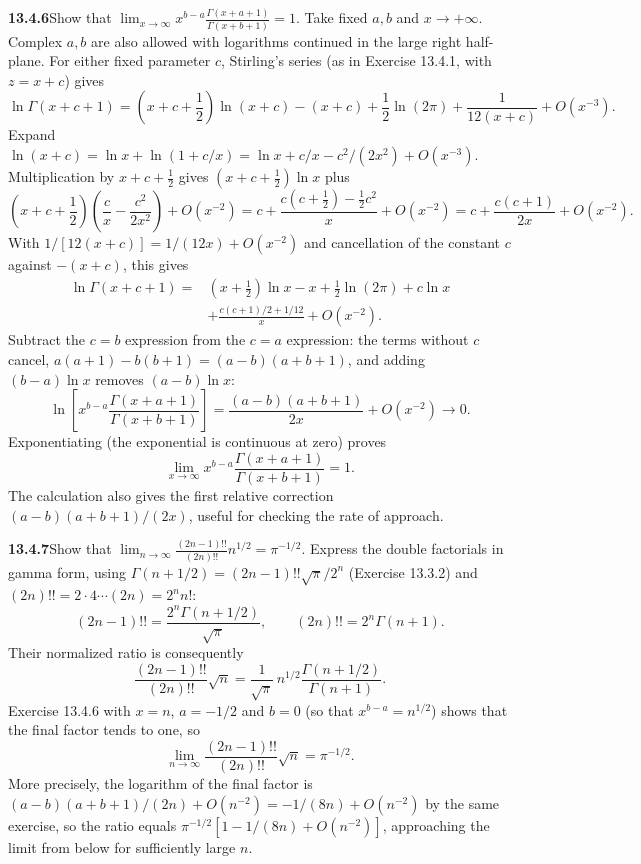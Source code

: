\par\bigskip
\noindent\textbf{13.4.6}\quad Show that
$\displaystyle\lim_{x\to\infty}x^{b-a}\frac{\Gamma(x+a+1)}{\Gamma(x+b+1)}=1$.
\solution
Take fixed $a,b$ and $x\to+\infty$.  Complex $a,b$ are also
allowed with logarithms continued in the large right half-plane.
For either fixed parameter $c$, Stirling's series (as in
Exercise 13.4.1, with $z=x+c$) gives
\[
\ln\Gamma(x+c+1)
=\left(x+c+\frac12\right)\ln(x+c)-(x+c)
+\frac12\ln(2\pi)+\frac1{12(x+c)}+O(x^{-3}).
\]
Expand $\ln(x+c)=\ln x+\ln(1+c/x)=\ln x+c/x-c^2/(2x^2)+O(x^{-3})$.
Multiplication by $x+c+\frac12$ gives
$(x+c+\frac12)\ln x$ plus
\[
\left(x+c+\frac12\right)\left(\frac cx-\frac{c^2}{2x^2}\right)
+O(x^{-2})
=c+\frac{c(c+\frac12)-\frac12c^2}{x}+O(x^{-2})
=c+\frac{c(c+1)}{2x}+O(x^{-2}).
\]
With $1/[12(x+c)]=1/(12x)+O(x^{-2})$ and cancellation of the
constant $c$ against $-(x+c)$, this gives
\begin{align*}
\ln\Gamma(x+c+1)
={}&\left(x+\frac12\right)\ln x-x+\frac12\ln(2\pi)
+c\ln x\\
&+\frac{c(c+1)/2+1/12}{x}+O(x^{-2}).
\end{align*}
Subtract the $c=b$ expression from the $c=a$ expression: the
terms without $c$ cancel, $a(a+1)-b(b+1)=(a-b)(a+b+1)$, and adding
$(b-a)\ln x$ removes $(a-b)\ln x$:
\[
\ln\left[x^{b-a}\frac{\Gamma(x+a+1)}{\Gamma(x+b+1)}\right]
=\frac{(a-b)(a+b+1)}{2x}+O(x^{-2})\longrightarrow0.
\]
Exponentiating (the exponential is continuous at zero) proves
\[
\boxed{\lim_{x\to\infty}x^{b-a}
\frac{\Gamma(x+a+1)}{\Gamma(x+b+1)}=1}.
\]
The calculation also gives the first relative correction
$(a-b)(a+b+1)/(2x)$, useful for checking the rate of approach.


\par\bigskip
\noindent\textbf{13.4.7}\quad Show that
$\displaystyle\lim_{n\to\infty}\frac{(2n-1)!!}{(2n)!!}n^{1/2}=\pi^{-1/2}$.
\solution
Express the double factorials in gamma form, using
$\Gamma(n+1/2)=(2n-1)!!\sqrt\pi/2^n$ (Exercise 13.3.2) and
$(2n)!!=2\cdot4\cdots(2n)=2^nn!$:
\[
(2n-1)!!=\frac{2^n\Gamma(n+1/2)}{\sqrt\pi},
\qquad (2n)!!=2^n\Gamma(n+1).
\]
Their normalized ratio is consequently
\[
\frac{(2n-1)!!}{(2n)!!}\sqrt n
=\frac1{\sqrt\pi}\,
 n^{1/2}\frac{\Gamma(n+1/2)}{\Gamma(n+1)}.
\]
Exercise 13.4.6 with $x=n$, $a=-1/2$ and $b=0$ (so that
$x^{b-a}=n^{1/2}$) shows that the final factor tends to one, so
\[
\boxed{\lim_{n\to\infty}\frac{(2n-1)!!}{(2n)!!}\sqrt n
=\pi^{-1/2}}.
\]
More precisely, the logarithm of the final factor is
$(a-b)(a+b+1)/(2n)+O(n^{-2})=-1/(8n)+O(n^{-2})$ by the same
exercise, so the ratio equals
$\pi^{-1/2}[1-1/(8n)+O(n^{-2})]$, approaching the limit from
below for sufficiently large $n$.


